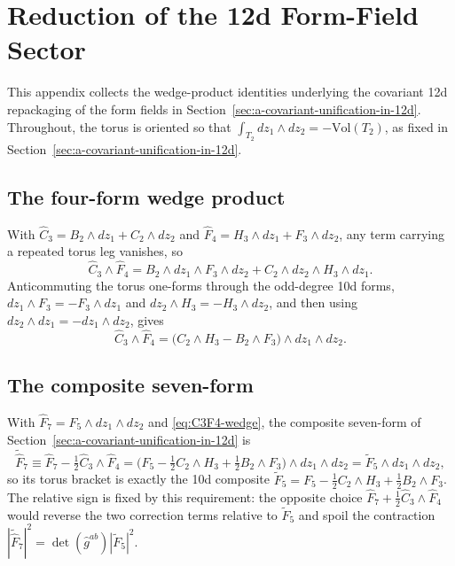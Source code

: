 \section{Reduction of the 12d Form-Field Sector}
\label{sec:form-field-reduction}
This appendix collects the wedge-product identities underlying the covariant 12d repackaging of the form fields in Section~\ref{sec:a-covariant-unification-in-12d}.
Throughout, the torus is oriented so that $\int_{T_2}dz_1\wedge dz_2 = -\mathrm{Vol}(T_2)$, as fixed in Section~\ref{sec:a-covariant-unification-in-12d}.

\subsection*{The four-form wedge product}
With $\widehat C_3 = B_2\wedge dz_1 + C_2\wedge dz_2$ and $\widehat F_4 = H_3\wedge dz_1 + F_3\wedge dz_2$, any term carrying a repeated torus leg vanishes, so
\begin{equation}
\widehat C_3\wedge\widehat F_4 = B_2\wedge dz_1\wedge F_3\wedge dz_2 + C_2\wedge dz_2\wedge H_3\wedge dz_1 .
\end{equation}
Anticommuting the torus one-forms through the odd-degree 10d forms, $dz_1\wedge F_3 = -F_3\wedge dz_1$ and $dz_2\wedge H_3 = -H_3\wedge dz_2$, and then using $dz_2\wedge dz_1 = -dz_1\wedge dz_2$, gives
\begin{equation}
\widehat C_3\wedge\widehat F_4 = \big(C_2\wedge H_3 - B_2\wedge F_3\big)\wedge dz_1\wedge dz_2 .
\label{eq:C3F4-wedge}
\end{equation}

\subsection*{The composite seven-form}
With $\widehat F_7 = F_5\wedge dz_1\wedge dz_2$ and \eqref{eq:C3F4-wedge}, the composite seven-form of Section~\ref{sec:a-covariant-unification-in-12d} is
\begin{equation}
\widetilde{\widehat F}_7 \equiv \widehat F_7 - \tfrac12\widehat C_3\wedge\widehat F_4
= \Big(F_5 - \tfrac12 C_2\wedge H_3 + \tfrac12 B_2\wedge F_3\Big)\wedge dz_1\wedge dz_2
= \tilde F_5\wedge dz_1\wedge dz_2 ,
\end{equation}
so its torus bracket is exactly the 10d composite $\tilde F_5 = F_5 - \tfrac12 C_2\wedge H_3 + \tfrac12 B_2\wedge F_3$.
The relative sign is fixed by this requirement: the opposite choice $\widehat F_7 + \tfrac12\widehat C_3\wedge\widehat F_4$ would reverse the two correction terms relative to $\tilde F_5$ and spoil the contraction $|\widetilde{\widehat F}_7|^2 = \det(\widehat g^{ab})|\tilde F_5|^2$.

